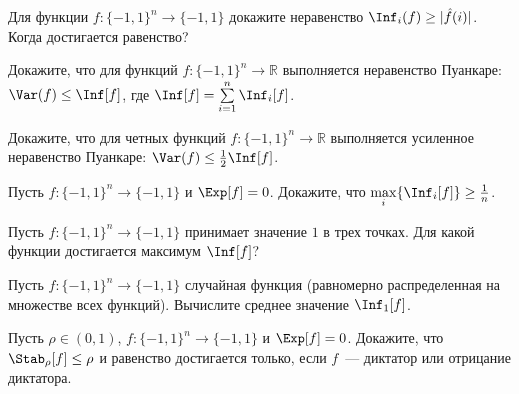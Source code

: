 \begin{task}
    Для функции $f: \{-1, 1\}^n \to \{-1, 1\}$ докажите неравенство $\Inf_i(f) \ge |\hat f(i)|$. Когда достигается равенство?
\end{task}

\begin{task}
    Докажите, что для функций $f: \{-1, 1\}^n \to \mathbb{R}$ выполняется неравенство Пуанкаре: $\Var(f) \le \Inf[f]$, где $\Inf[f]
    = \sum\limits_{i = 1}^n \Inf_i[f]$.
\end{task}

\begin{task}
	Докажите, что для четных функций $f: \{-1, 1\}^n \to \mathbb{R}$ выполняется усиленное неравенство Пуанкаре: $\Var(f) \le
    \frac{1}{2} \Inf[f]$.
\end{task}

\begin{task}
    Пусть $f: \{-1, 1\}^n \to \{-1, 1\}$ и $\Exp[f] = 0$. Докажите, что $\max\limits_i \{\Inf_i[f]\} \ge \frac{1}{n}$.
\end{task}

\begin{task}
	Пусть $f: \{-1, 1\}^n \to \{-1, 1\}$ принимает значение $1$ в трех точках. Для какой функции достигается максимум $\Inf[f]$?
\end{task}

\begin{task}
	Пусть $f: \{-1, 1\}^n \to \{-1, 1\}$ случайная функция (равномерно распределенная на множестве всех функций). Вычислите
    среднее значение $\Inf_1[f]$.
\end{task}

\begin{task}
    Пусть $\rho \in (0,1)$, $f: \{-1, 1\}^n \to \{-1, 1\}$ и $\Exp[f] = 0$. Докажите, что $\Stab_\rho[f] \le \rho$ и равенство
    достигается только, если $f$~--- диктатор или отрицание диктатора.
\end{task}


